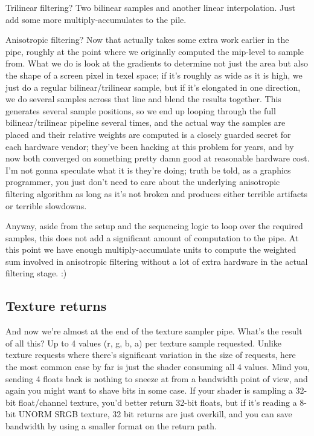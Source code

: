 \documentclass[12pt]{article}
\begin{document}
Trilinear filtering? Two bilinear samples and another linear interpolation. Just add some more multiply-accumulates to the pile.

Anisotropic filtering? Now that actually takes some extra work earlier in the pipe, roughly at the point where we originally computed the mip-level to sample from. What we do is look at the gradients to determine not just the area but also the shape of a screen pixel in texel space; if it’s roughly as wide as it is high, we just do a regular bilinear/trilinear sample, but if it’s elongated in one direction, we do several samples across that line and blend the results together. This generates several sample positions, so we end up looping through the full bilinear/trilinear pipeline several times, and the actual way the samples are placed and their relative weights are computed is a closely guarded secret for each hardware vendor; they’ve been hacking at this problem for years, and by now both converged on something pretty damn good at reasonable hardware cost. I’m not gonna speculate what it is they’re doing; truth be told, as a graphics programmer, you just don’t need to care about the underlying anisotropic filtering algorithm as long as it’s not broken and produces either terrible artifacts or terrible slowdowns.

Anyway, aside from the setup and the sequencing logic to loop over the required samples, this does not add a significant amount of computation to the pipe. At this point we have enough multiply-accumulate units to compute the weighted sum involved in anisotropic filtering without a lot of extra hardware in the actual filtering stage. :)

\subsection{Texture returns}
\label{sec:org83e4cd7}

And now we’re almost at the end of the texture sampler pipe. What’s the result of all this? Up to 4 values (r, g, b, a) per texture sample requested. Unlike texture requests where there’s significant variation in the size of requests, here the most common case by far is just the shader consuming all 4 values. Mind you, sending 4 floats back is nothing to sneeze at from a bandwidth point of view, and again you might want to shave bits in some case. If your shader is sampling a 32-bit float/channel texture, you’d better return 32-bit floats, but if it’s reading a 8-bit UNORM SRGB texture, 32 bit returns are just overkill, and you can save bandwidth by using a smaller format on the return path.
\end{document}
